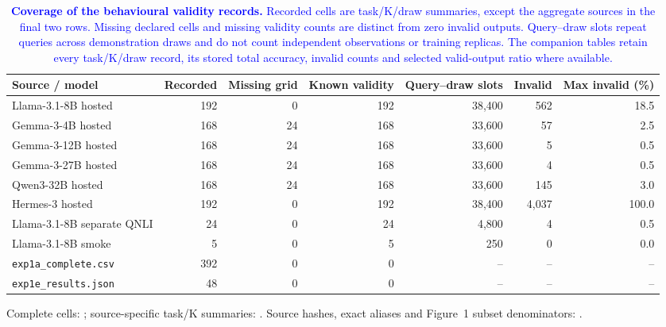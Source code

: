 \begin{table}[t]
\centering\color{blue}
\caption{\textcolor{blue}{\textbf{Coverage of the behavioural validity records.}
Recorded cells are task/K/draw summaries, except the aggregate sources in the final
two rows. Missing declared cells and missing validity counts are distinct from zero
invalid outputs. Query--draw slots repeat queries across demonstration draws and
do not count independent observations or training replicas. The companion tables
retain every task/K/draw record, its stored total accuracy, invalid counts and
selected valid-output ratio where available.}}
\label{stab:behavioural_validity}
\footnotesize
\setlength{\tabcolsep}{4pt}
\begin{adjustbox}{max width=\textwidth}
\begin{tabular}{lrrrrrr}
\toprule
Source / model & Recorded & Missing grid & Known validity & Query--draw slots & Invalid & Max invalid (\%) \\
\midrule
Llama-3.1-8B hosted & 192 & 0 & 192 & 38,400 & 562 & 18.5 \\
Gemma-3-4B hosted & 168 & 24 & 168 & 33,600 & 57 & 2.5 \\
Gemma-3-12B hosted & 168 & 24 & 168 & 33,600 & 5 & 0.5 \\
Gemma-3-27B hosted & 168 & 24 & 168 & 33,600 & 4 & 0.5 \\
Qwen3-32B hosted & 168 & 24 & 168 & 33,600 & 145 & 3.0 \\
Hermes-3 hosted & 192 & 0 & 192 & 38,400 & 4,037 & 100.0 \\
Llama-3.1-8B separate QNLI & 24 & 0 & 24 & 4,800 & 4 & 0.5 \\
Llama-3.1-8B smoke & 5 & 0 & 5 & 250 & 0 & 0.0 \\
\texttt{exp1a\_complete.csv} & 392 & 0 & 0 & -- & -- & -- \\
\texttt{exp1e\_results.json} & 48 & 0 & 0 & -- & -- & -- \\
\bottomrule
\end{tabular}
\end{adjustbox}

\raggedright\footnotesize
Complete cells: ;
source-specific task/K summaries: .
Source hashes, exact aliases and Figure~1 subset denominators:
.


\end{table}
